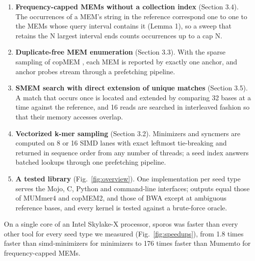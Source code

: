 \begin{enumerate}
  \item \textbf{Frequency-capped MEMs without a collection index} (Section 3.4). The occurrences of a MEM's string in the reference correspond one to one to the MEMs whose query interval contains it (Lemma 1), so a sweep that retains the N largest interval ends counts occurrences up to a cap N.
  \item \textbf{Duplicate-free MEM enumeration} (Section 3.3). With the sparse sampling of copMEM \citep{Grabowski2019}, each MEM is reported by exactly one anchor, and anchor probes stream through a prefetching pipeline.
  \item \textbf{SMEM search with direct extension of unique matches} (Section 3.5). A match that occurs once is located and extended by comparing 32 bases at a time against the reference, and 16 reads are searched in interleaved fashion so that their memory accesses overlap.
  \item \textbf{Vectorized k-mer sampling} (Section 3.2). Minimizers and syncmers are computed on 8 or 16 SIMD lanes with exact leftmost tie-breaking and returned in sequence order from any number of threads; a seed index answers batched lookups through one prefetching pipeline.
  \item \textbf{A tested library} (Fig.~\ref{fig:overview}). One implementation per seed type serves the Mojo, C, Python and command-line interfaces; outputs equal those of MUMmer4 and copMEM2, and those of BWA except at ambiguous reference bases, and every kernel is tested against a brute-force oracle.
\end{enumerate}

On a single core of an Intel Skylake-X processor, sporos was faster than every other tool for every seed type we measured (Fig.~\ref{fig:speedups}), from 1.8 times faster than simd-minimizers for minimizers to 176 times faster than Mumemto for frequency-capped MEMs.
